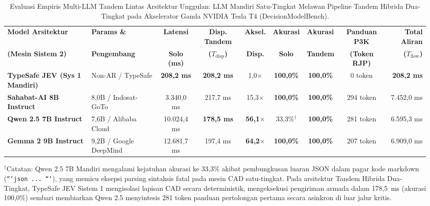 \documentclass[journal,compsoc]{IEEEtran}
\begin{document}
\begin{table}[t]
\caption{Evaluasi Empiris Multi-LLM Tandem Lintas Arsitektur Unggulan: LLM Mandiri Satu-Tingkat Melawan Pipeline Tandem Hibrida Dua-Tingkat pada Akselerator Ganda NVIDIA Tesla T4 (DecisionModelBench).}
\label{tab:evaluasi_tandem_multi_llm}
\centering
\footnotesize
\setlength{\tabcolsep}{2.5pt}
\begin{tabular*}{\textwidth}{@{\extracolsep{\fill}}llccccccr@{}}
\toprule
\textbf{Model Arsitektur} & \textbf{Params \&} & \textbf{Latensi} & \textbf{Disp. Tandem} & \textbf{Aksel.} & \textbf{Akurasi} & \textbf{Akurasi} & \textbf{Panduan P3K} & \textbf{Total Aliran} \\
\textbf{(Mesin Sistem 2)} & \textbf{Pengembang} & \textbf{Solo (ms)} & \textbf{($T_{\text{disp}}$)} & \textbf{Disp.} & \textbf{Solo} & \textbf{Tandem} & \textbf{(Token RJP)} & \textbf{($T_{\text{flow}}$)} \\
\midrule
\textbf{TypeSafe JEV (Sys 1 Mandiri)} & Non-AR / TypeSafe & \textbf{208,2 ms} & \textbf{208,2 ms} & 1,0$\times$ & \textbf{100,0\%} & \textbf{100,0\%} & 0 token & \textbf{208,2 ms} \\
\midrule
\textbf{Sahabat-AI 8B Instruct} & 8,0B / Indosat-GoTo & 3.340,0 ms & 217,7 ms & 15,3$\times$ & \textbf{100,0\%} & \textbf{100,0\%} & 294 token & 7.452,0 ms \\
\textbf{Qwen 2.5 7B Instruct} & 7,6B / Alibaba Cloud & 10.024,4 ms & \textbf{178,5 ms} & \textbf{56,1$\times$} & 33,3\%$^\dagger$ & \textbf{100,0\%} & 281 token & 6.595,3 ms \\
\textbf{Gemma 2 9B Instruct} & 9,2B / Google DeepMind & 12.681,7 ms & 197,4 ms & \textbf{64,2$\times$} & \textbf{100,0\%} & \textbf{100,0\%} & 207 token & 6.909,0 ms \\
\bottomrule
\end{tabular*}
\vspace{1ex}
\begin{flushleft}
\footnotesize{$^\dagger$Catatan: Qwen 2.5 7B Mandiri mengalami kejatuhan akurasi ke 33,3\% akibat pembungkusan luaran JSON dalam pagar kode markdown (\texttt{```json ... ```}), yang memicu eksepsi parsing sintaksis fatal pada mesin CAD satu-tingkat. Pada arsitektur Tandem Hibrida Dua-Tingkat, TypeSafe JEV Sistem 1 mengisolasi lapisan CAD secara deterministik, mengeksekusi pengiriman armada dalam 178,5~ms (akurasi 100,0\%) sembari membiarkan Qwen 2.5 menyintesis 281 token panduan pertolongan pertama secara asinkron di luar jalur kritis.}
\end{flushleft}
\end{table}
\end{document}
